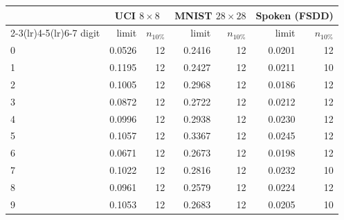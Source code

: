 \begin{tabular}{lrrrrrr}
\toprule
& \multicolumn{2}{c}{UCI $8\times8$} & \multicolumn{2}{c}{MNIST $28\times28$} & \multicolumn{2}{c}{Spoken (FSDD)} \\
\cmidrule(lr){2-3}\cmidrule(lr){4-5}\cmidrule(lr){6-7}
digit & limit & $n_{10\%}$ & limit & $n_{10\%}$ & limit & $n_{10\%}$ \\
\midrule
0 & 0.0526 & 12 & 0.2416 & 12 & 0.0201 & 12 \\
1 & 0.1195 & 12 & 0.2427 & 12 & 0.0211 & 10 \\
2 & 0.1005 & 12 & 0.2968 & 12 & 0.0186 & 12 \\
3 & 0.0872 & 12 & 0.2722 & 12 & 0.0212 & 12 \\
4 & 0.0996 & 12 & 0.2938 & 12 & 0.0230 & 12 \\
5 & 0.1057 & 12 & 0.3367 & 12 & 0.0245 & 12 \\
6 & 0.0671 & 12 & 0.2673 & 12 & 0.0198 & 12 \\
7 & 0.1022 & 12 & 0.2816 & 12 & 0.0232 & 10 \\
8 & 0.0961 & 12 & 0.2579 & 12 & 0.0224 & 12 \\
9 & 0.1053 & 12 & 0.2683 & 12 & 0.0205 & 10 \\
\bottomrule
\end{tabular}
